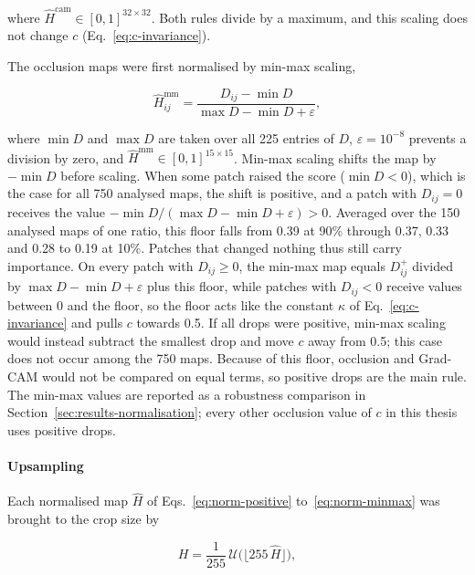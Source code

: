 where $\hat{H}^{\mathrm{cam}} \in [0,1]^{32 \times 32}$. Both rules divide by a
maximum, and this scaling does not change $c$ (Eq.~\eqref{eq:c-invariance}).

The occlusion maps were first normalised by min-max scaling,

\begin{equation}
\hat{H}^{\mathrm{mm}}_{ij} = \frac{D_{ij} - \min D}{\max D - \min D + \varepsilon},
\label{eq:norm-minmax}
\end{equation}

where $\min D$ and $\max D$ are taken over all 225 entries of $D$,
$\varepsilon = 10^{-8}$ prevents a division by zero, and
$\hat{H}^{\mathrm{mm}} \in [0,1]^{15 \times 15}$. Min-max scaling shifts the map by
$-\min D$ before scaling. When some patch raised the score ($\min D < 0$), which is the
case for all 750 analysed maps, the shift is positive, and a patch with $D_{ij} = 0$
receives the value $-\min D / (\max D - \min D + \varepsilon) > 0$. Averaged over the
150 analysed maps of one ratio, this floor falls from 0.39 at 90\% through 0.37, 0.33
and 0.28 to 0.19 at 10\%. Patches that changed nothing
thus still carry importance. On every patch with $D_{ij} \ge 0$, the min-max map equals
$D^+_{ij}$ divided by $\max D - \min D + \varepsilon$ plus this floor, while patches with
$D_{ij} < 0$ receive values between 0 and the floor, so the floor acts like the constant
$\kappa$ of Eq.~\eqref{eq:c-invariance} and pulls $c$ towards 0.5. If all drops were positive, min-max scaling would instead subtract the
smallest drop and move $c$ away from 0.5; this case does not occur among the 750 maps.
Because of this floor, occlusion and Grad-CAM would not be compared on equal terms, so
positive drops are the main rule. The min-max values are reported as a
robustness comparison in Section~\ref{sec:results-normalisation}; every other occlusion
value of $c$ in this thesis uses positive drops.

\paragraph{Upsampling}
Each normalised map $\hat{H}$ of Eqs.~\eqref{eq:norm-positive}
to~\eqref{eq:norm-minmax} was brought to the crop size by

\begin{equation}
H = \frac{1}{255}\, \mathcal{U}\big( \lfloor 255\, \hat{H} \rfloor \big),
\label{eq:upsample}
\end{equation}

